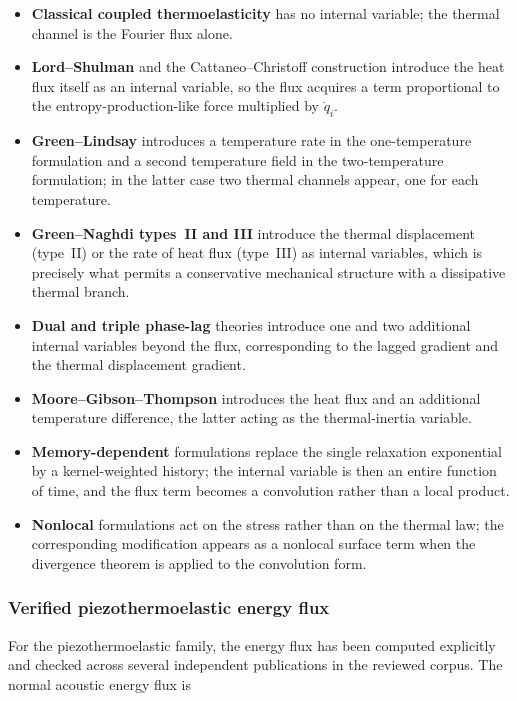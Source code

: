 \begin{itemize}
\item \textbf{Classical coupled thermoelasticity} has no internal variable; the thermal channel is the Fourier flux alone.
\item \textbf{Lord--Shulman} and the Cattaneo--Christoff construction introduce the heat flux itself as an internal variable, so the flux acquires a term proportional to the entropy-production-like force multiplied by $\dot{q}_i$.
\item \textbf{Green--Lindsay} introduces a temperature rate in the one-temperature formulation and a second temperature field in the two-temperature formulation; in the latter case two thermal channels appear, one for each temperature.
\item \textbf{Green--Naghdi types~II and III} introduce the thermal displacement (type~II) or the rate of heat flux (type~III) as internal variables, which is precisely what permits a conservative mechanical structure with a dissipative thermal branch.
\item \textbf{Dual and triple phase-lag} theories introduce one and two additional internal variables beyond the flux, corresponding to the lagged gradient and the thermal displacement gradient.
\item \textbf{Moore--Gibson--Thompson} introduces the heat flux and an additional temperature difference, the latter acting as the thermal-inertia variable.
\item \textbf{Memory-dependent} formulations replace the single relaxation exponential by a kernel-weighted history; the internal variable is then an entire function of time, and the flux term becomes a convolution rather than a local product.
\item \textbf{Nonlocal} formulations act on the stress rather than on the thermal law; the corresponding modification appears as a nonlocal surface term when the divergence theorem is applied to the convolution form.
\end{itemize}

\subsubsection{Verified piezothermoelastic energy flux}

For the piezothermoelastic family, the energy flux has been computed explicitly and checked across several independent publications in the reviewed corpus. The normal acoustic energy flux is

